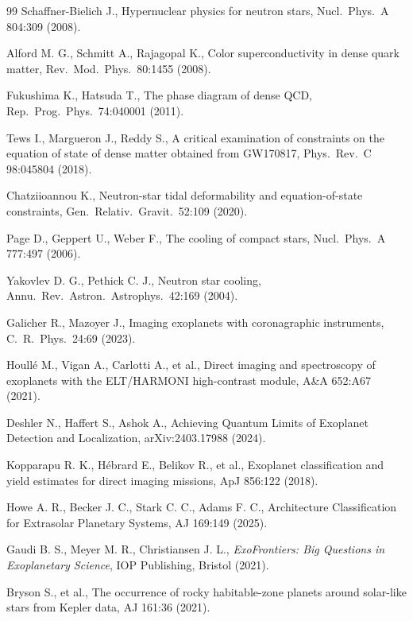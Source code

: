\begin{thebibliography}{99}
Schaffner-Bielich J., Hypernuclear physics for neutron stars, Nucl.\ Phys.\ A 804:309 (2008).

Alford M. G., Schmitt A., Rajagopal K., Color superconductivity in dense quark matter, Rev.\ Mod.\ Phys.\ 80:1455 (2008).

Fukushima K., Hatsuda T., The phase diagram of dense QCD, Rep.\ Prog.\ Phys.\ 74:040001 (2011).

Tews I., Margueron J., Reddy S., A critical examination of constraints on the equation of state of dense matter obtained from GW170817, Phys.\ Rev.\ C 98:045804 (2018).

Chatziioannou K., Neutron-star tidal deformability and equation-of-state constraints, Gen.\ Relativ.\ Gravit.\ 52:109 (2020).

Page D., Geppert U., Weber F., The cooling of compact stars, Nucl.\ Phys.\ A 777:497 (2006).

Yakovlev D. G., Pethick C. J., Neutron star cooling, Annu.\ Rev.\ Astron.\ Astrophys.\ 42:169 (2004).

Galicher R., Mazoyer J., Imaging exoplanets with coronagraphic instruments, C.\ R.\ Phys.\ 24:69 (2023).

Houll\'e M., Vigan A., Carlotti A., et al., Direct imaging and spectroscopy of exoplanets with the ELT/HARMONI high-contrast module, A\&A 652:A67 (2021).

Deshler N., Haffert S., Ashok A., Achieving Quantum Limits of Exoplanet Detection and Localization, arXiv:2403.17988 (2024).

Kopparapu R. K., H\'ebrard E., Belikov R., et al., Exoplanet classification and yield estimates for direct imaging missions, ApJ 856:122 (2018).

Howe A. R., Becker J. C., Stark C. C., Adams F. C., Architecture Classification for Extrasolar Planetary Systems, AJ 169:149 (2025).

Gaudi B. S., Meyer M. R., Christiansen J. L., \textit{ExoFrontiers: Big Questions in Exoplanetary Science}, IOP Publishing, Bristol (2021).

Bryson S., et al., The occurrence of rocky habitable-zone planets around solar-like stars from Kepler data, AJ 161:36 (2021).


\end{thebibliography}
